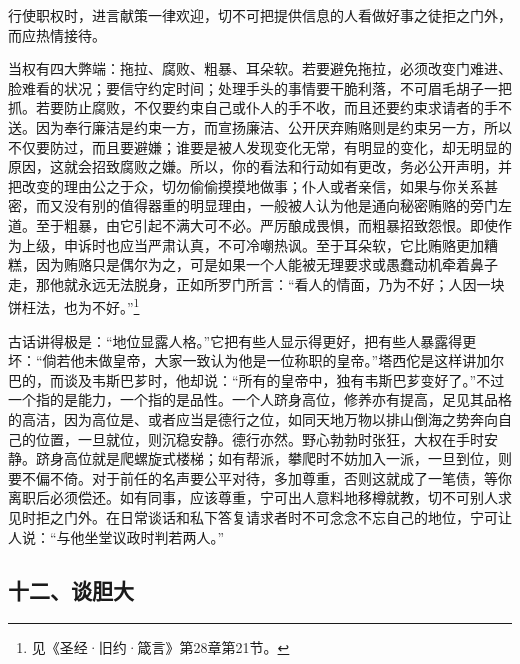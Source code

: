\par 行使职权时，进言献策一律欢迎，切不可把提供信息的人看做好事之徒拒之门外，而应热情接待。
\par 当权有四大弊端：拖拉、腐败、粗暴、耳朵软。若要避免拖拉，必须改变门难进、脸难看的状况；要信守约定时间；处理手头的事情要干脆利落，不可眉毛胡子一把抓。若要防止腐败，不仅要约束自己或仆人的手不收，而且还要约束求请者的手不送。因为奉行廉洁是约束一方，而宣扬廉洁、公开厌弃贿赂则是约束另一方，所以不仅要防过，而且要避嫌；谁要是被人发现变化无常，有明显的变化，却无明显的原因，这就会招致腐败之嫌。所以，你的看法和行动如有更改，务必公开声明，并把改变的理由公之于众，切勿偷偷摸摸地做事；仆人或者亲信，如果与你关系甚密，而又没有别的值得器重的明显理由，一般被人认为他是通向秘密贿赂的旁门左道。至于粗暴，由它引起不满大可不必。严厉酿成畏惧，而粗暴招致怨恨。即使作为上级，申诉时也应当严肃认真，不可冷嘲热讽。至于耳朵软，它比贿赂更加糟糕，因为贿赂只是偶尔为之，可是如果一个人能被无理要求或愚蠢动机牵着鼻子走，那他就永远无法脱身，正如所罗门所言：“看人的情面，乃为不好；人因一块饼枉法，也为不好。”\footnote{见《圣经·旧约·箴言》第28章第21节。}
\par 古话讲得极是：“地位显露人格。”它把有些人显示得更好，把有些人暴露得更坏：“倘若他未做皇帝，大家一致认为他是一位称职的皇帝。”塔西佗是这样讲加尔巴的，而谈及韦斯巴芗时，他却说：“所有的皇帝中，独有韦斯巴芗变好了。”不过一个指的是能力，一个指的是品性。一个人跻身高位，修养亦有提高，足见其品格的高洁，因为高位是、或者应当是德行之位，如同天地万物以排山倒海之势奔向自己的位置，一旦就位，则沉稳安静。德行亦然。野心勃勃时张狂，大权在手时安静。跻身高位就是爬螺旋式楼梯；如有帮派，攀爬时不妨加入一派，一旦到位，则要不偏不倚。对于前任的名声要公平对待，多加尊重，否则这就成了一笔债，等你离职后必须偿还。如有同事，应该尊重，宁可出人意料地移樽就教，切不可别人求见时拒之门外。在日常谈话和私下答复请求者时不可念念不忘自己的地位，宁可让人说：“与他坐堂议政时判若两人。”



\subsection*{十二、谈胆大}


